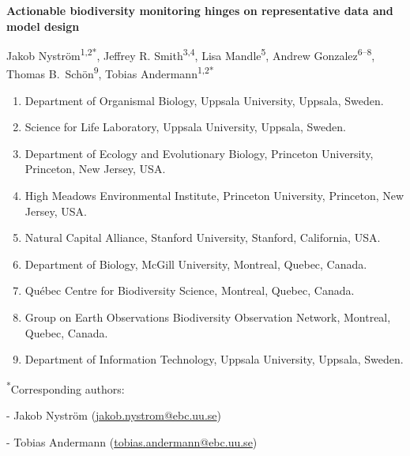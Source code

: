 
\begin{center}

{\LARGE\bfseries
Actionable biodiversity monitoring hinges on representative data and model design
\par}

\vspace{2\baselineskip}

Jakob Nyström\textsuperscript{1,2*},
Jeffrey R. Smith\textsuperscript{3,4},
Lisa Mandle\textsuperscript{5},
Andrew Gonzalez\textsuperscript{6--8},
\\Thomas B.~Schön\textsuperscript{9},
Tobias Andermann\textsuperscript{1,2*}

\vspace{\baselineskip}

\vspace{\baselineskip}

\begin{minipage}{0.85\textwidth}
\scriptsize
\begin{enumerate}[leftmargin=*,labelsep=0.5em]
\setlength{\itemsep}{0.2em}
\item Department of Organismal Biology, Uppsala University, Uppsala, Sweden.
\item Science for Life Laboratory, Uppsala University, Uppsala, Sweden.
\item Department of Ecology and Evolutionary Biology, Princeton University, Princeton, New Jersey, USA.
\item High Meadows Environmental Institute, Princeton University, Princeton, New Jersey, USA.
\item Natural Capital Alliance, Stanford University, Stanford, California, USA.
\item Department of Biology, McGill University, Montreal, Quebec, Canada.
\item Québec Centre for Biodiversity Science, Montreal, Quebec, Canada.
\item Group on Earth Observations Biodiversity Observation Network, Montreal, Quebec, Canada.
\item Department of Information Technology, Uppsala University, Uppsala, Sweden.
\end{enumerate}

\vspace{\baselineskip}

\small
\textsuperscript{*}Corresponding authors:

- Jakob Nyström (\href{mailto:jakob.nystrom@ebc.uu.se}{jakob.nystrom@ebc.uu.se})

- Tobias Andermann (\href{mailto:tobias.andermann@ebc.uu.se}{tobias.andermann@ebc.uu.se})

\end{minipage}

\end{center}
